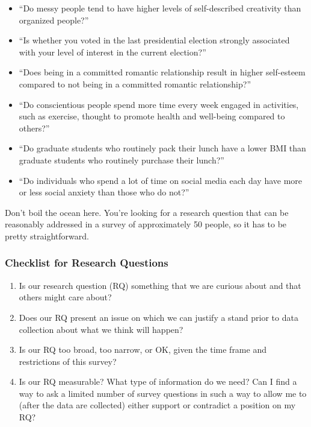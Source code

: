 \documentclass[]{book}
\providecommand{\tightlist}{%
  \setlength{\itemsep}{0pt}\setlength{\parskip}{0pt}}
\theoremstyle{definition}
\theoremstyle{definition}
\theoremstyle{definition}
\theoremstyle{remark}
\begin{document}
\begin{itemize}
\tightlist
\item
  ``Do messy people tend to have higher levels of self-described
  creativity than organized people?''
\item
  ``Is whether you voted in the last presidential election strongly
  associated with your level of interest in the current election?''
\item
  ``Does being in a committed romantic relationship result in higher
  self-esteem compared to not being in a committed romantic
  relationship?''
\item
  ``Do conscientious people spend more time every week engaged in
  activities, such as exercise, thought to promote health and well-being
  compared to others?''
\item
  ``Do graduate students who routinely pack their lunch have a lower BMI
  than graduate students who routinely purchase their lunch?''
\item
  ``Do individuals who spend a lot of time on social media each day have
  more or less social anxiety than those who do not?''
\end{itemize}

Don't boil the ocean here. You're looking for a research question that
can be reasonably addressed in a survey of approximately 50 people, so
it has to be pretty straightforward.

\hypertarget{checklist-for-research-questions}{%
\subsubsection{Checklist for Research
Questions}\label{checklist-for-research-questions}}

\begin{enumerate}
\def\labelenumi{\arabic{enumi}.}
\tightlist
\item
  Is our research question (RQ) something that we are curious about and
  that others might care about?
\item
  Does our RQ present an issue on which we can justify a stand prior to
  data collection about what we think will happen?
\item
  Is our RQ too broad, too narrow, or OK, given the time frame and
  restrictions of this survey?
\item
  Is our RQ measurable? What type of information do we need? Can I find
  a way to ask a limited number of survey questions in such a way to
  allow me to (after the data are collected) either support or
  contradict a position on my RQ?
\end{enumerate}
\end{document}
